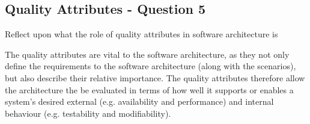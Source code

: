 \subsection{Quality Attributes - Question 5}

\begin{question}
Reflect upon what the role of quality attributes in software
architecture is
\end{question}

The quality attributes are vital to the software architecture, as they not only define the requirements to the software architecture (along with the scenarios), but also describe their relative importance. The quality attributes therefore allow the architecture the be evaluated in terms of how well it supports or enables a system's desired external (e.g. availability and performance) and internal behaviour (e.g. testability and modifiability). \cite{h_sarjoughian2002}
